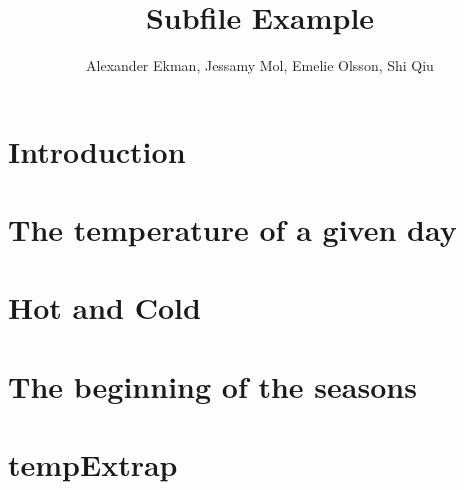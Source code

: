 \documentclass[a4paper]{article}
\title{Subfile Example}
\author{Alexander Ekman, Jessamy Mol, Emelie Olsson, Shi Qiu}
\date{ }
\begin{document}
 
 
 

\maketitle

\section{Introduction}
 


\section{The temperature of a given day}


\section{Hot and Cold}


\section{The beginning of the seasons}


\section{tempExtrap}


\newpage


 
\end{document}
